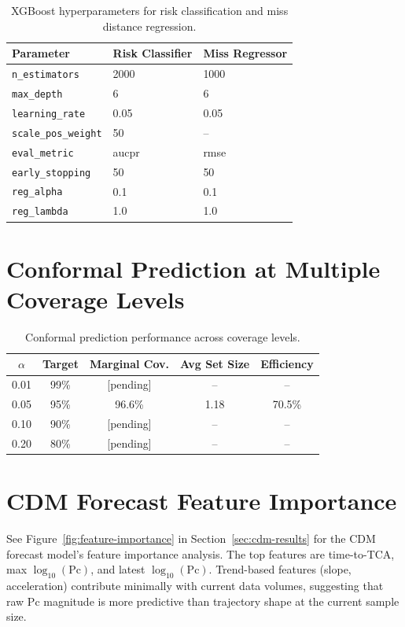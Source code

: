 \documentclass{article}
\begin{document}
\begin{table}[h]
\centering
\caption{XGBoost hyperparameters for risk classification and miss distance regression.}
\label{tab:xgboost-params}
\begin{tabular}{@{}lll@{}}
\toprule
Parameter & Risk Classifier & Miss Regressor \\
\midrule
\texttt{n\_estimators} & 2000 & 1000 \\
\texttt{max\_depth} & 6 & 6 \\
\texttt{learning\_rate} & 0.05 & 0.05 \\
\texttt{scale\_pos\_weight} & 50 & -- \\
\texttt{eval\_metric} & aucpr & rmse \\
\texttt{early\_stopping} & 50 & 50 \\
\texttt{reg\_alpha} & 0.1 & 0.1 \\
\texttt{reg\_lambda} & 1.0 & 1.0 \\
\bottomrule
\end{tabular}
\end{table}

\section{Conformal Prediction at Multiple Coverage Levels}
\label{app:conformal}

\begin{table}[h]
\centering
\caption{Conformal prediction performance across coverage levels.}
\label{tab:conformal-levels}
\begin{tabular}{@{}ccccc@{}}
\toprule
$\alpha$ & Target & Marginal Cov. & Avg Set Size & Efficiency \\
\midrule
0.01 & 99\% & [pending] & -- & -- \\
0.05 & 95\% & 96.6\% & 1.18 & 70.5\% \\
0.10 & 90\% & [pending] & -- & -- \\
0.20 & 80\% & [pending] & -- & -- \\
\bottomrule
\end{tabular}
\end{table}

\section{CDM Forecast Feature Importance}
\label{app:feature-importance}

See Figure~\ref{fig:feature-importance} in Section~\ref{sec:cdm-results} for the CDM forecast model's feature importance analysis. The top features are time-to-TCA, max $\log_{10}(\text{Pc})$, and latest $\log_{10}(\text{Pc})$. Trend-based features (slope, acceleration) contribute minimally with current data volumes, suggesting that raw Pc magnitude is more predictive than trajectory shape at the current sample size.
\end{document}

